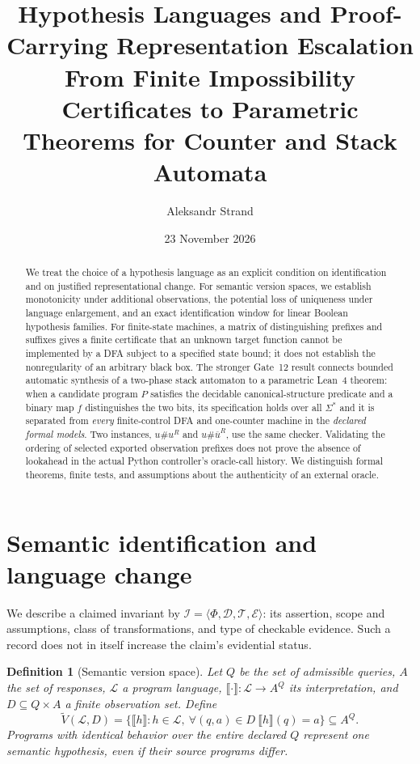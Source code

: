 \documentclass[11pt,a4paper]{article}
\title{\bfseries\color{ink}Hypothesis Languages and Proof-Carrying Representation Escalation\\[4pt]
\large\normalfont From Finite Impossibility Certificates to Parametric Theorems for Counter and Stack Automata}
\author{Aleksandr Strand}
\date{23 November 2026}
\newtheorem{definition}{Definition}[section]
\newcommand{\sem}[1]{\llbracket #1\rrbracket}
\newcommand{\VS}{\widetilde V}
\begin{document}
\maketitle
\vspace{-1.0em}
\begin{abstract}
We treat the choice of a hypothesis language as an explicit condition on identification and on justified representational change. For semantic version spaces, we establish monotonicity under additional observations, the potential loss of uniqueness under language enlargement, and an exact identification window for linear Boolean hypothesis families. For finite-state machines, a matrix of distinguishing prefixes and suffixes gives a finite certificate that an unknown target function cannot be implemented by a DFA subject to a specified state bound; it does not establish the nonregularity of an arbitrary black box. The stronger Gate~12 result connects bounded automatic synthesis of a two-phase stack automaton to a parametric Lean~4 theorem: when a candidate program $P$ satisfies the decidable canonical-structure predicate and a binary map $f$ distinguishes the two bits, its specification holds over all $\Sigma^*$ and it is separated from \emph{every} finite-control DFA and one-counter machine in the \emph{declared formal models}. Two instances, $u\#u^R$ and $u\#\overline u^R$, use the same checker. Validating the ordering of selected exported observation prefixes does not prove the absence of lookahead in the actual Python controller's oracle-call history. We distinguish formal theorems, finite tests, and assumptions about the authenticity of an external oracle.
\end{abstract}

\section{Semantic identification and language change}

We describe a claimed invariant by $\mathcal I=\langle\Phi,\mathcal D,\mathcal T,\mathcal E\rangle$: its assertion, scope and assumptions, class of transformations, and type of checkable evidence. Such a record does not in itself increase the claim's evidential status.

\begin{definition}[Semantic version space]
Let $Q$ be the set of admissible queries, $A$ the set of responses, $\mathcal L$ a program language, $\sem\cdot:\mathcal L\to A^Q$ its interpretation, and $D\subseteq Q\times A$ a finite observation set. Define
\begin{equation}\label{eq:version}
\VS(\mathcal L,D)=\{\sem h:h\in\mathcal L,\ \forall(q,a)\in D\ \sem h(q)=a\}\subseteq A^Q.
\end{equation}
Programs with identical behavior over the entire declared $Q$ represent one semantic hypothesis, even if their source programs differ.
\end{definition}
\end{document}
